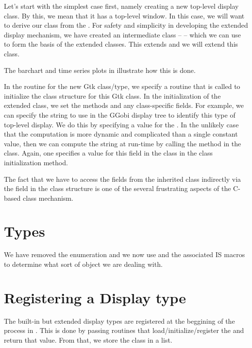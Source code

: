 \documentclass{article}
\begin{document}
Let's start with the simplest case first, namely creating a new
top-level display class.  By this, we mean that it has a top-level
window.  In this case, we will want to derive our class from the
.  For safety and simplicity in
developing the extended display mechanism, we have created an
intermediate class --  -- which
we can use to form the basis of the extended classes.  This extends
 and we will extend this class.

The barchart and time series plots in 
illustrate how this is done.

In the  routine for the new Gtk class/type, we
specify a routine that is called to initialize the class structure for
this Gtk class.  In the initialization of the extended class, we set
the methods and any class-specific fields.  For example, we can
specify the string to use in the GGobi display tree to identify this
type of top-level display.  We do this by specifying a value for the
. In the unlikely case that the computation is more
dynamic and complicated than a single constant value, then we can
compute the string at run-time by calling the 
method in the class. Again, one specifies a value for this field in
the class in the class initialization method.

The fact that we have to access the fields from the inherited class
indirectly via the  field in the class structure
is one of the several frustrating aspects of the C-based class
mechanism.


\section{Types}
We have removed the  enumeration and we now use
 and the associated IS macros to determine what sort of
object we are dealing with.


\section{Registering a Display type}

The built-in but extended display types are registered at the
beggining of the process in .  This is done by
passing routines that load/initialize/register the  and
return that value. From that, we store the class in a list.
\end{document}
